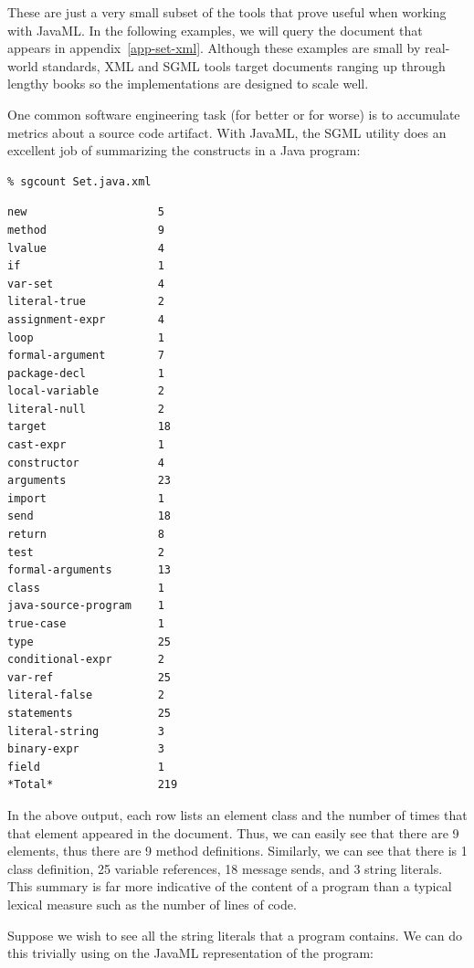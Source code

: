 \documentclass{article}
\begin{document}
These are just a very small subset of the tools that prove useful when
working with JavaML.  In the following examples, we will query the
 document that appears in
appendix~\ref{app-set-xml}.  Although these examples are small
by real-world standards, XML and SGML tools target documents ranging up
through lengthy books so the implementations are designed to
scale well.

One common software engineering task (for better or for worse)
is to accumulate metrics about a
source code artifact.  With JavaML, the SGML utility
 does an excellent job of summarizing the constructs
in a Java program:

\begin{verbatim}
% sgcount Set.java.xml
\end{verbatim}

\begin{verbatim}
new                    5  
method                 9  
lvalue                 4  
if                     1  
var-set                4  
literal-true           2  
assignment-expr        4  
loop                   1  
formal-argument        7  
package-decl           1  
local-variable         2  
literal-null           2  
target                 18 
cast-expr              1  
constructor            4  
arguments              23 
import                 1  
send                   18 
return                 8  
test                   2  
formal-arguments       13 
class                  1  
java-source-program    1  
true-case              1  
type                   25 
conditional-expr       2  
var-ref                25 
literal-false          2  
statements             25 
literal-string         3  
binary-expr            3  
field                  1  
*Total*                219 
\end{verbatim}

In the above output, each row lists an element class and the number of
times that that element appeared in the document.  Thus, we can easily
see that there are 9  elements, thus there are 9
method definitions.  Similarly, we can see that there is 1 class
definition, 25 variable references, 18 message sends, and 3 string
literals.  This summary is far more indicative of the content of a
program than a typical lexical measure such as the number of lines of
code.

Suppose we wish to see all the string literals that a program contains.
We can do this trivially using  on the JavaML
representation of the program:
\end{document}
